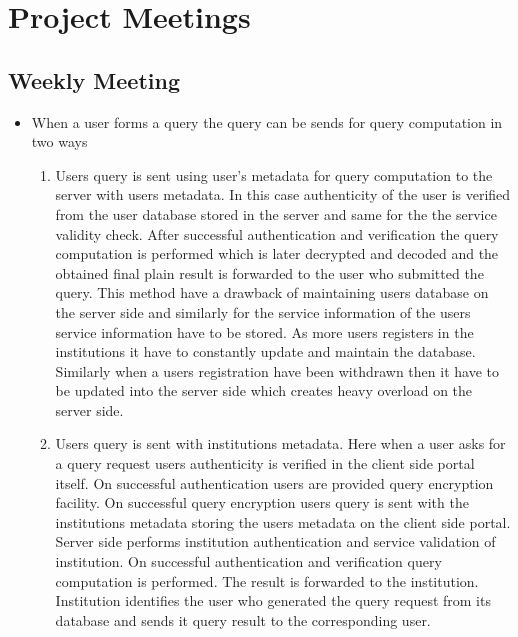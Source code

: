 
\chapter{Project Meetings} %
\setcounter{section}{0}


\section{Weekly Meeting}

\begin{itemize}
    \item When a user forms a query the query can be sends for query computation in two ways
          \begin{enumerate}
              \item Users query is sent using user's metadata for query computation  to the server with users metadata. In this case authenticity of the user is verified from the user database stored in the server and same for the the service validity check. After successful authentication and verification the query computation is performed which is later decrypted and decoded and the obtained final plain result is forwarded to the user who submitted the query. This method have a drawback of maintaining users database on the server side and similarly for the service information of the users service information have to be stored. As more users registers in the institutions it have to constantly update and maintain the database. Similarly when a users registration have been withdrawn then it have to be updated into the server side which creates heavy overload on the server side.
              \item Users query is sent with institutions metadata. Here when a user asks for a query request users authenticity is verified in the client side portal itself. On successful authentication users are provided query encryption facility. On successful query encryption users query is sent with the institutions metadata storing the users metadata on the client side portal. Server side performs institution authentication and service validation of institution. On successful authentication and verification query computation is performed. The result is forwarded to the institution. Institution identifies the user who generated the query request from its database and sends it query result to the corresponding user.

\end{enumerate}
\end{itemize}
